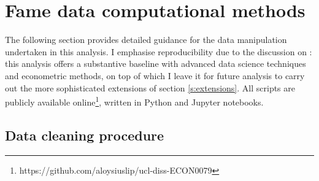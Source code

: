 \section{Fame data computational methods}
\label{app:data-cleaning}

The following section provides detailed guidance for the data manipulation undertaken in this analysis.
I emphasise reproducibility due to the discussion on :
this analysis offers a substantive baseline with advanced data science techniques and econometric methods,
on top of which I leave it for future analysis to carry out the more sophisticated extensions of section \ref{s:extensions}.
All scripts are publicly available
online\footnote{https://github.com/aloysiuslip/ucl-diss-ECON0079},
written in Python and Jupyter notebooks.

\subsection{Data cleaning procedure}
\label{app-ss:financial-data}

